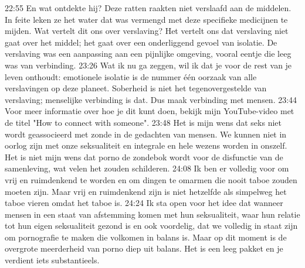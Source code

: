 22:55
En wat ontdekte hij? Deze ratten raakten niet verslaafd aan de middelen. In feite leken ze het water dat was vermengd met deze specifieke medicijnen te mijden. Wat vertelt dit ons over verslaving? Het vertelt ons dat verslaving niet gaat over het middel; het gaat over een onderliggend gevoel van isolatie. De verslaving was een aanpassing aan een pijnlijke omgeving, vooral eentje die leeg was van verbinding.
23:26
Wat ik nu ga zeggen, wil ik dat je voor de rest van je leven onthoudt: emotionele isolatie is de nummer één oorzaak van alle verslavingen op deze planeet. Soberheid is niet het tegenovergestelde van verslaving; menselijke verbinding is dat. Dus maak verbinding met mensen.
23:44
Voor meer informatie over hoe je dit kunt doen, bekijk mijn YouTube-video met de titel "How to connect with someone".
23:48
Het is mijn wens dat seks niet wordt geassocieerd met zonde in de gedachten van mensen. We kunnen niet in oorlog zijn met onze seksualiteit en integrale en hele wezens worden in onszelf. Het is niet mijn wens dat porno de zondebok wordt voor de disfunctie van de samenleving, wat velen het zouden schilderen.
24:08
Ik ben er volledig voor om vrij en ruimdenkend te worden en om dingen te omarmen die nooit taboe zouden moeten zijn. Maar vrij en ruimdenkend zijn is niet hetzelfde als simpelweg het taboe vieren omdat het taboe is.
24:24
Ik sta open voor het idee dat wanneer mensen in een staat van afstemming komen met hun seksualiteit, waar hun relatie tot hun eigen seksualiteit gezond is en ook voordelig, dat we volledig in staat zijn om pornografie te maken die volkomen in balans is. Maar op dit moment is de overgrote meerderheid van porno diep uit balans. Het is een leeg pakket en je verdient iets substantieels.
